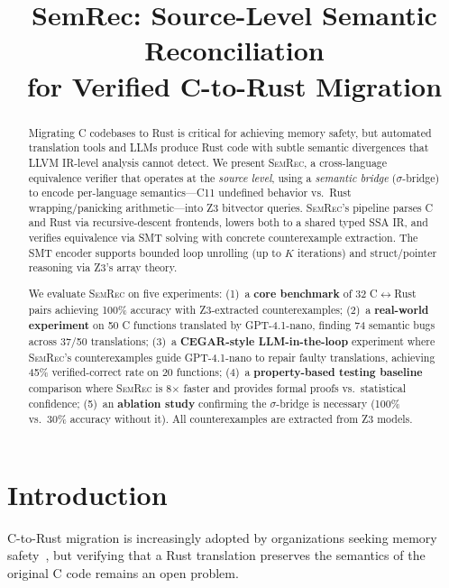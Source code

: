 \documentclass[11pt,a4paper]{article}
\title{\textbf{SemRec: Source-Level Semantic Reconciliation\\for Verified C-to-Rust Migration}}
\date{}
\begin{document}
\maketitle

\begin{abstract}
Migrating C codebases to Rust is critical for achieving memory safety,
but automated translation tools and LLMs produce Rust code with subtle semantic
divergences that LLVM IR-level analysis cannot detect. We present \textsc{SemRec},
a cross-language equivalence verifier that operates at the \emph{source level},
using a \emph{semantic bridge} ($\sigma$-bridge) to encode per-language
semantics---C11 undefined behavior vs.\ Rust wrapping/panicking arithmetic---into
Z3 bitvector queries.  \textsc{SemRec}'s pipeline parses C and Rust via
recursive-descent frontends, lowers both to a shared typed SSA IR, and verifies
equivalence via SMT solving with concrete counterexample extraction.
The SMT encoder supports bounded loop unrolling (up to $K$ iterations) and
struct/pointer reasoning via Z3's array theory.

We evaluate \textsc{SemRec} on five experiments:
(1)~a \textbf{core benchmark} of 32 C$\leftrightarrow$Rust pairs
achieving 100\% accuracy with Z3-extracted counterexamples;
(2)~a \textbf{real-world experiment} on 50 C functions translated by
GPT-4.1-nano, finding 74 semantic bugs across 37/50 translations;
(3)~a \textbf{CEGAR-style LLM-in-the-loop} experiment where \textsc{SemRec}'s
counterexamples guide GPT-4.1-nano to repair faulty translations,
achieving 45\% verified-correct rate on 20 functions;
(4)~a \textbf{property-based testing baseline} comparison where \textsc{SemRec}
is 8$\times$ faster and provides formal proofs vs.\ statistical confidence;
(5)~an \textbf{ablation study} confirming the $\sigma$-bridge is necessary
(100\% vs.\ 30\% accuracy without it).
All counterexamples are extracted from Z3 models.
\end{abstract}

\section{Introduction}\label{sec:intro}

C-to-Rust migration is increasingly adopted by organizations seeking memory
safety~\cite{chromium2019memory, microsoft2019safety, nsa2022memory}, but
verifying that a Rust translation preserves the semantics of the original
C code remains an open problem.
\end{document}
